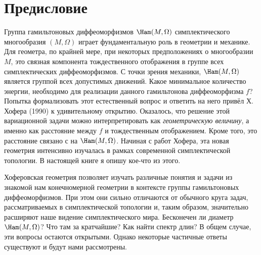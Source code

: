 \chapter*{Предисловие}

Группа гамильтоновых диффеоморфизмов $\Ham(M,\Omega)$ симплектического многообразия $(M,\Omega)$ играет фундаментальную роль  в геометрии и механике.
Для геометра, по крайней мере, при некоторых предположениях о многообразии $M$, это связная компонента тождественного отображения в группе всех симплектических диффеоморфизмов.
С точки зрения механики, $\Ham(M,\Omega)$ является группой всех допустимых движений.
Какое минимальное количество энергии, необходимо для реализации данного гамильтонова диффеоморфизма $f$?
Попытка формализовать этот естественный вопрос и ответить на него привёл Х. Хофера \cite{H1} (1990) к удивительному открытию.
Оказалось, что решение этой вариационной задачи можно интерпретировать как \emph{геометрическую величину}, а именно как расстояние между $f$ и тождественным отображением.
Кроме того, это расстояние связано с  на $\Ham(M,\Omega)$. 
Начиная с работ Хофера, эта новая геометрия интенсивно изучалась в рамках современной симплектической топологии.
В настоящей книге я опишу кое-что из этого.

Хоферовская геометрия позволяет изучать различные понятия и задачи из знакомой нам конечномерной геометрии в контексте группы гамильтоновых диффеоморфизмов.
При этом они сильно отличаются от обычного круга задач, рассматриваемых в симплектической топологии и, таким образом, значительно расширяют наше видение симплектического мира.
Бесконечен ли диаметр $\Ham(M,\Omega)$?
Что там за кратчайшие?
Как найти спектр длин?
В общем случае, эти вопросы остаются открытыми.
Однако некоторые частичные ответы существуют и будут нами рассмотрены.


